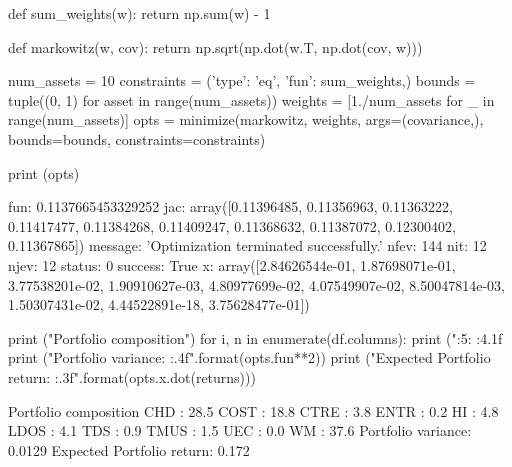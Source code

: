 \begin{solution}
\begin{ipython}
def sum_weights(w):
    return np.sum(w) - 1

def markowitz(w, cov):
    return np.sqrt(np.dot(w.T, np.dot(cov, w)))

num_assets = 10
constraints = ({'type': 'eq', 'fun': sum_weights},)
bounds = tuple((0, 1) for asset in range(num_assets))
weights = [1./num_assets for _ in range(num_assets)]
opts = minimize(markowitz, weights, args=(covariance,),
    bounds=bounds, constraints=constraints)

print (opts)

    fun: 0.1137665453329252
    jac: array([0.11396485, 0.11356963, 0.11363222, 0.11417477, 0.11384268,
                0.11409247, 0.11368632, 0.11387072, 0.12300402, 0.11367865])
message: 'Optimization terminated successfully.'
   nfev: 144
    nit: 12
   njev: 12
 status: 0
success: True
      x: array([2.84626544e-01, 1.87698071e-01, 3.77538201e-02, 
                1.90910627e-03, 4.80977699e-02, 4.07549907e-02, 
                8.50047814e-03, 1.50307431e-02, 4.44522891e-18, 
                3.75628477e-01])

print ("Portfolio composition")
for i, n in enumerate(df.columns):
    print ("{:5}: {:4.1f}%
print ("Portfolio variance: {:.4f}".format(opts.fun**2))
print ("Expected Portfolio return: {:.3f}".format(opts.x.dot(returns)))

Portfolio composition
CHD  : 28.5%
COST : 18.8%
CTRE : 3.8%
ENTR : 0.2%
HI   : 4.8%
LDOS : 4.1%
TDS  : 0.9%
TMUS : 1.5%
UEC  : 0.0%
WM   : 37.6%
Portfolio variance: 0.0129
Expected Portfolio return: 0.172
\end{ipython}
\end{solution}

